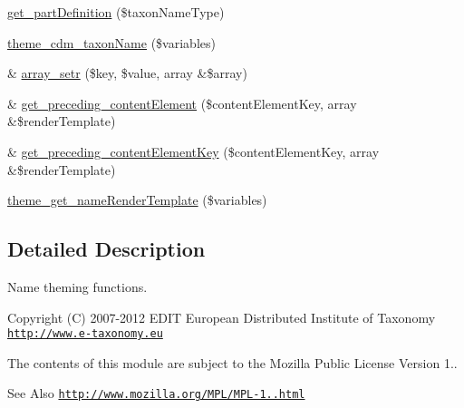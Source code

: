 \begin{DoxyCompactItemize}
\item 
\hyperlink{cdm__dataportal_8name_8theme_a369519511b9546fbe03c9392fd222c9a}{get\-\_\-part\-Definition} (\$taxon\-Name\-Type)
\item 
\hyperlink{cdm__dataportal_8name_8theme_a90422d3429b4a2292bfd211747375cf7}{theme\-\_\-cdm\-\_\-taxon\-Name} (\$variables)
\item 
\& \hyperlink{cdm__dataportal_8name_8theme_a8aeb749efb6925249a66718355008467}{array\-\_\-setr} (\$key, \$value, array \&\$array)
\item 
\& \hyperlink{cdm__dataportal_8name_8theme_ac60cc40a1303e332927c1362d6af4a9d}{get\-\_\-preceding\-\_\-content\-Element} (\$content\-Element\-Key, array \&\$render\-Template)
\item 
\& \hyperlink{cdm__dataportal_8name_8theme_adf590864a0ac87814989601732ba1c98}{get\-\_\-preceding\-\_\-content\-Element\-Key} (\$content\-Element\-Key, array \&\$render\-Template)
\item 
\hyperlink{cdm__dataportal_8name_8theme_af4692c4178ea09d7a6658d02d7e28c6e}{theme\-\_\-get\-\_\-name\-Render\-Template} (\$variables)
\end{DoxyCompactItemize}


\subsection{Detailed Description}
Name theming functions.

\begin{DoxyCopyright}{Copyright}
(C) 2007-\/2012 E\-D\-I\-T European Distributed Institute of Taxonomy \href{http://www.e-taxonomy.eu}{\tt http\-://www.\-e-\/taxonomy.\-eu}
\end{DoxyCopyright}
The contents of this module are subject to the Mozilla Public License Version 1.. \begin{DoxySeeAlso}{See Also}
\href{http://www.mozilla.org/MPL/MPL-1.1.html}{\tt http\-://www.\-mozilla.\-org/\-M\-P\-L/\-M\-P\-L-\/1..\-html} 
\end{DoxySeeAlso}


